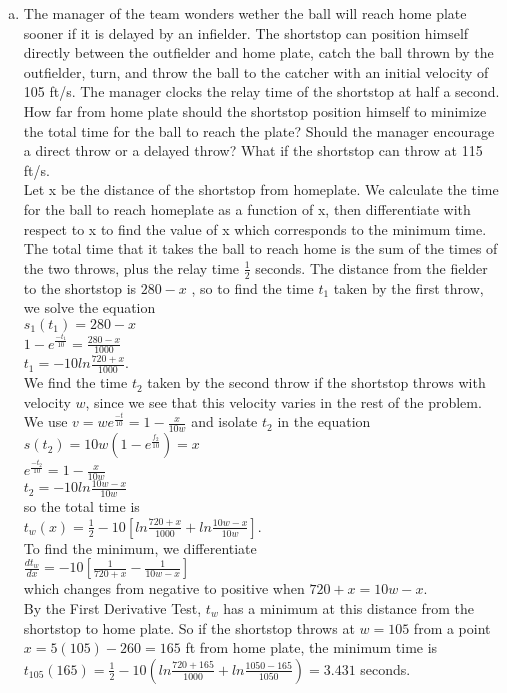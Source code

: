 \documentclass[paper=a4, fontsize=11pt]{scrartcl}
\numberwithin{equation}{section}
\numberwithin{figure}{section}
\numberwithin{table}{section}
\begin{document}
\begin{enumerate}[1.]
\begin{enumerate}[(a)]
		\item The manager of the team wonders wether the ball will reach home plate sooner if it is delayed by an infielder. The shortstop can position himself directly between the outfielder and home plate, catch the ball thrown by the outfielder, turn, and throw the ball to the catcher with an initial velocity of 105 ft/s. The manager clocks the relay time of the shortstop at half a second. How far from home plate should the shortstop position himself to minimize the total time for the ball to reach the plate? Should the manager encourage a direct throw or a delayed throw? What if the shortstop can throw at 115 ft/s. \\


\medskip
		Let x be the distance of the shortstop from homeplate. We calculate the time for the ball to reach homeplate as a function of x, then differentiate with respect to x to find the value of x which
		corresponds to the minimum time. The total time that it takes the ball to reach home is the sum of the times of the two throws, plus the relay time $\frac{1}{2}$ seconds. The distance from the 				fielder to the shortstop is $ 280 - x$ , so to find the time $t_1$ taken by the first throw, we solve the equation\\

		$s_1(t_1) = 280 - x$ \\
		$1-e^\frac{-t_1}{10} = \frac{280-x}{1000}$\\
		$t_1 = -10ln\frac{720+x}{1000}$.\\
\medskip
		We find the time $t_2$ taken by the second throw if the shortstop throws with velocity $w$, since we see that this velocity varies in the rest of the problem. \\
		We use $v = we^\frac{-t}{10} = 1 - 			\frac{x}{10w}$ and isolate $t_2$ in the equation $s(t_2) = 10w(1-e^\frac{f_2}{10}) = x$\\
		$e^\frac{-t_2}{10} = 1 - \frac{x}{10w}$\\
		$t_2 = -10ln\frac{10w-x}{10w}$\\
		so the total time is\\
 		$t_w(x) = \frac{1}{2}-10[ln\frac{720+x}{1000}  + ln\frac{10w-x}{10w}]$.\\
		To find the minimum, we differentiate\\
		$\frac{dt_w}{dx} = -10[\frac{1}{720+x} - \frac{1}{10w-x}]$\\
		which changes from negative to positive when $720 + x = 10w-x$.\\
\medskip
		By the First Derivative Test, $t_w$ has a minimum at this distance from the shortstop to home plate. So if the shortstop throws at $w = 105$ from a point $x = 5(105) - 260 = 165$ ft from home 				plate, the minimum time is $t_{105} (165) = \frac{1}{2} - 10(ln\frac{720+165}{1000} + ln\frac{1050-165}{1050}) = 3.431$ seconds.\\
\medskip


\end{enumerate}
\end{enumerate}
\end{document}
